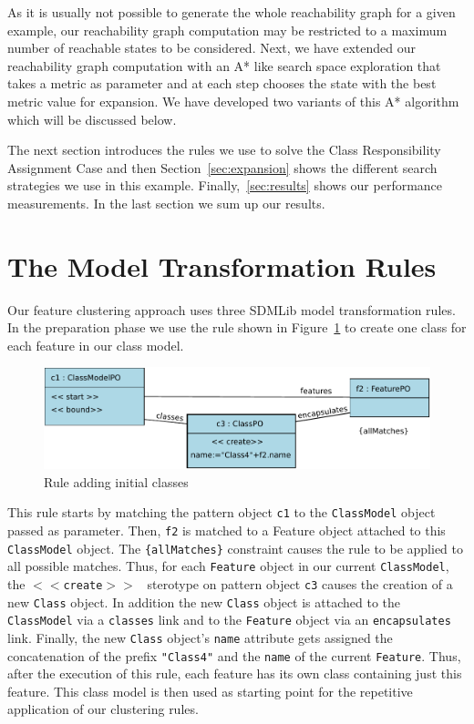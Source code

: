 \documentclass[submission,copyright,creativecommons]{eptcs}
\begin{document}
As it is usually not possible to generate the whole reachability graph for a given example, 
our reachability graph computation may be restricted to a maximum number of reachable 
states to be considered. Next, we have extended our reachability graph computation with an A* 
like search space exploration that takes a metric as parameter and at each step chooses the 
state with the best metric value for expansion. We have developed two variants of this A* 
algorithm which will be discussed below. 

The next section introduces the rules we use to solve the Class Responsibility Assignment Case
and then Section~\ref{sec:expansion} shows the different search strategies we use in this 
example. Finally,~\ref{sec:results} shows our performance measurements. In the last section
we sum up our results. 
 
\section{The Model Transformation Rules}
\label{sec:rules}

Our feature clustering approach uses three SDMLib model transformation rules. In the 
preparation phase we use the rule shown in Figure~\ref{fig:RuleInitialClasses} to create 
one class for each feature in our class model. 

\begin{figure}[ht] \centering
	\includegraphics[width=\linewidth]{images/RuleAddInitialClasses.pdf}
 \caption{Rule adding initial classes}
 \label{fig:RuleInitialClasses}
\end{figure}

This rule starts by matching the pattern object \texttt{c1} to the 
\texttt{ClassModel} object passed as parameter. Then, \texttt{f2} is matched to a 
Feature object attached to this \texttt{ClassModel} object. The 
\texttt{\{allMatches\}} constraint causes the rule to be applied to all possible 
matches. Thus, for each \texttt{Feature} object in our current 
\texttt{ClassModel}, the \texttt {$<<$create$>>$ } sterotype on pattern object 
\texttt{c3} causes the creation of a new \texttt{Class} object. In addition 
the new \texttt{Class} object is attached to the \texttt{ClassModel} via a 
\texttt{classes} link and to the \texttt{Feature} object via an 
\texttt{encapsulates} link. Finally, the new \texttt{Class} object's \texttt{name} 
attribute gets assigned the concatenation of the prefix \texttt{"Class4"} 
and the \texttt{name} of the current \texttt{Feature}. Thus, after the 
execution of this rule, each feature has its own class containing just this 
feature. This class model is then used as starting point for the repetitive 
application of our clustering rules. 
\end{document}
